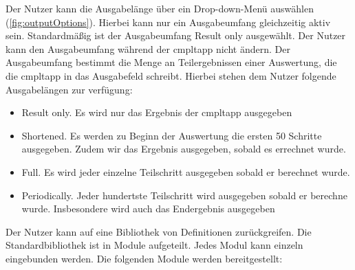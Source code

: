 \documentclass[parskip=full,11pt,twoside]{scrartcl}
\begin{document}
Der Nutzer kann die Ausgabelänge über ein Drop-down-Menü auswählen (\cref{fig:outputOptions}).
Hierbei kann nur ein Ausgabeumfang gleichzeitig aktiv sein. 
Standardmäßig ist der Ausgabeumfang Result only ausgewählt. 
Der Nutzer kann den Ausgabeumfang während der \gls{cmpltapp} nicht ändern.
Der Ausgabeumfang bestimmt die Menge an Teilergebnissen einer Auswertung, die die \gls{cmpltapp} in das Ausgabefeld schreibt.
Hierbei stehen dem Nutzer folgende Ausgabelängen zur verfügung:
\begin{itemize}
	\item Result only. Es wird nur das Ergebnis der \gls{cmpltapp} ausgegeben
	\item Shortened. Es werden zu Beginn der Auswertung die ersten 50 Schritte ausgegeben.
	Zudem wir das Ergebnis ausgegeben, sobald es errechnet wurde.
	\item Full. Es wird jeder einzelne Teilschritt ausgegeben sobald er berechnet wurde.
	\item Periodically. Jeder hundertste Teilschritt wird ausgegeben sobald er berechne wurde. 
	Insbesondere wird auch das Endergebnis ausgegeben
\end{itemize}

Der Nutzer kann auf eine Bibliothek von Definitionen zurückgreifen. Die Standardbibliothek
ist in Module aufgeteilt. Jedes Modul kann einzeln eingebunden werden. Die folgenden
Module werden bereitgestellt:
\end{document}
